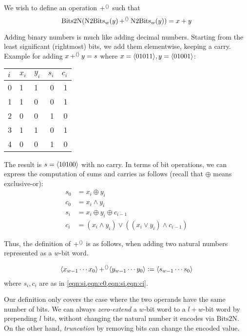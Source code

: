 We wish to define an operation $\operatorname{+^{\langle\rangle}}$ such that
\begin{equation}
  \mathrm{Bits2N}(\mathrm{N2Bits}_{w}(y)\operatorname{+^{\langle\rangle}}{}\mathrm{N2Bits}_{w}(y)) = x + y
\end{equation}

Adding binary numbers is much like adding decimal numbers.  Starting
from the least significant (rightmost) bits, we add them elementwise,
keeping a carry.  Example for adding $x\operatorname{+^{\langle\rangle}}{} y=s$ where
$x=\langle 01011 \rangle, y=\langle 01001 \rangle$:

\begin{center}
\begin{tabular}{l|llrr}
  $i$ & $x_{i}$ & $y_{i}$ & $s_{i}$ & $c_{i}$ \\\hline
  0 & 1 & 1 & 0 & 1 \\
  1 & 1 & 0 & 0 & 1 \\
  2 & 0 & 0 & 1 & 0 \\
  3 & 1 & 1 & 0 & 1 \\
  4 & 0 & 0 & 1 & 0
\end{tabular}
\end{center}

The result is $s=\langle 10100 \rangle$ with no carry.  In terms of bit
operations, we can express the computation of sums and carries as
follows (recall that $\oplus$ means exclusive-or):
\begin{align}
  s_{0} &= x_{i} \oplus y_{i} \label{eqn:s0} \\
  c_{0} &= x_{i} \land y_{i} \label{eqn:c0} \\
  s_{i} &= x_{i} \oplus y_{i} \oplus c_{i-1} \label{eqn:si} \\
  c_{i} &= (x_{i} \land y_{i})\lor ((x_{i}\lor y_{i})\land c_{i-1}) \label{eqn:ci}
\end{align}

Thus, the definition of $\operatorname{+^{\langle\rangle}}$ is as follows, when adding two
natural numbers represented as a $w$-bit word.
\begin{definition}
\begin{align*}
  \langle x_{w-1}\cdots{}x_{0} \rangle \operatorname{+^{\langle\rangle}} \langle y_{w-1}\cdots{}y_{0} \rangle \vcentcolon=
  \langle s_{w-1}\cdots{}s_{0} \rangle
\end{align*}
where $s_{i},c_{i}$ are as in \cref{eqn:si,eqn:c0,eqn:si,eqn:ci}.
\label{def:intadd}
\end{definition}

Our definition only covers the case where the two operands have the
same number of bits.  We can always \emph{zero-extend} a $w$-bit word
to a $l+w$-bit word by prepending $l$ bits, without changing the
natural number it encodes via $\mathrm{Bits2N}$.  On the other hand,
\emph{truncation} by removing bits can change the encoded value.

